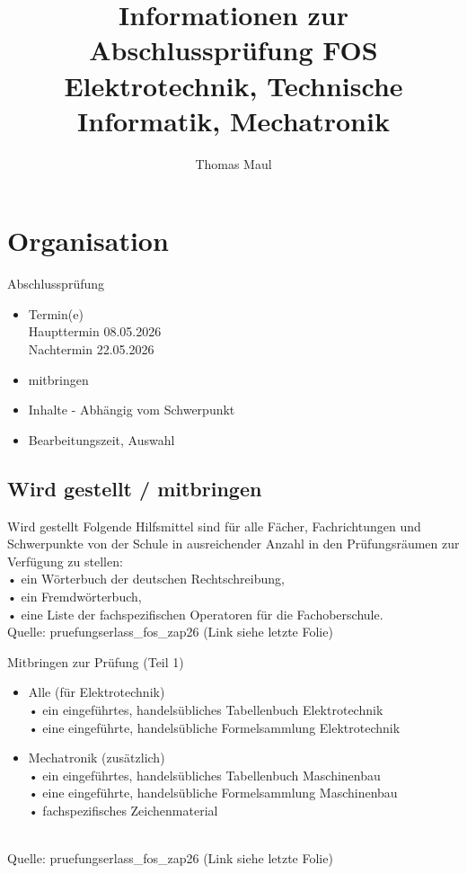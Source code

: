 \documentclass[aspectratio=169, ignorenonframetext]{beamer}
\title{Informationen zur Abschlussprüfung FOS\\ Elektrotechnik, Technische Informatik, Mechatronik}
\institute[BWS Hofheim]{Brühlwiesenschule, Hofheim}
\author{Thomas Maul}
\begin{document}
  \section{Organisation}
\begin{frame}{Abschlussprüfung}
\begin{itemize}
 \item Termin(e)\\Haupttermin 08.05.2026 \\Nachtermin 22.05.2026
 \item mitbringen
 \item Inhalte - Abhängig vom Schwerpunkt
 \item Bearbeitungszeit, Auswahl
\end{itemize}
\end{frame}
\subsection{Wird gestellt / mitbringen}
\begin{frame}{Wird gestellt}
  Folgende Hilfsmittel sind für alle Fächer, Fachrichtungen und Schwerpunkte von der Schule in ausreichender Anzahl in den Prüfungsräumen zur Verfügung zu stellen:\\
• ein Wörterbuch der deutschen Rechtschreibung,\\
• ein Fremdwörterbuch,\\
• eine Liste der fachspezifischen Operatoren für die Fachoberschule.
\\[\baselineskip] Quelle: pruefungserlass\_fos\_zap26 (Link siehe letzte Folie)
\end{frame}

\begin{frame}{Mitbringen zur Prüfung (Teil 1)}
  \begin{itemize}
  \item Alle (für Elektrotechnik)\\
 • ein eingeführtes,
handelsübliches
Tabellenbuch
Elektrotechnik\\
• eine eingeführte,
handelsübliche
Formelsammlung
Elektrotechnik
\item Mechatronik (zusätzlich)\\
• ein eingeführtes, handelsübliches Tabellenbuch
Maschinenbau\\
• eine eingeführte,
handelsübliche
Formelsammlung Maschinenbau\\
• fachspezifisches Zeichenmaterial
\end{itemize}
\ \\[\baselineskip] Quelle: pruefungserlass\_fos\_zap26 (Link siehe letzte Folie)
\end{frame}
\end{document}
